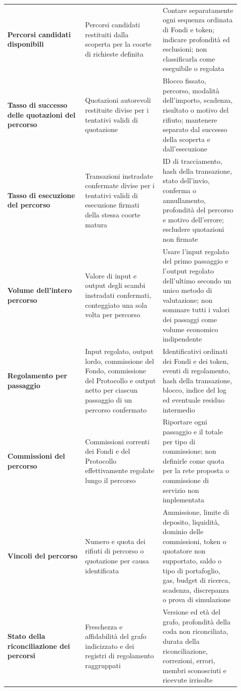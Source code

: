 \documentclass[11pt]{article}
\begin{document}
\begin{longtable}{P{0.31\linewidth} P{0.31\linewidth} P{0.31\linewidth}}
\textbf{Percorsi candidati disponibili} & Percorsi candidati restituiti dalla scoperta per la coorte di richieste definita & Contare separatamente ogni sequenza ordinata di Fondi e token; indicare profondità ed esclusioni; non classificarla come eseguibile o regolata \\
\textbf{Tasso di successo delle quotazioni del percorso} & Quotazioni autorevoli restituite divise per i tentativi validi di quotazione & Blocco fissato, percorso, modalità dell'importo, scadenza, risultato o motivo del rifiuto; mantenere separato dal successo della scoperta e dall'esecuzione \\
\textbf{Tasso di esecuzione del percorso} & Transazioni instradate confermate divise per i tentativi validi di esecuzione firmati della stessa coorte matura & ID di tracciamento, hash della transazione, stato dell'invio, conferma o annullamento, profondità del percorso e motivo dell'errore; escludere quotazioni non firmate \\
\textbf{Volume dell'intero percorso} & Valore di input e output degli scambi instradati confermati, conteggiato una sola volta per percorso & Usare l'input regolato del primo passaggio e l'output regolato dell'ultimo secondo un unico metodo di valutazione; non sommare tutti i valori dei passaggi come volume economico indipendente \\
\textbf{Regolamento per passaggio} & Input regolato, output lordo, commissione del Fondo, commissione del Protocollo e output netto per ciascun passaggio di un percorso confermato & Identificativi ordinati dei Fondi e dei token, eventi di regolamento, hash della transazione, blocco, indice del log ed eventuale residuo intermedio \\
\textbf{Commissioni del percorso} & Commissioni correnti dei Fondi e del Protocollo effettivamente regolate lungo il percorso & Riportare ogni passaggio e il totale per tipo di commissione; non definirle come quota per la rete proposta o commissione di servizio non implementata \\
\textbf{Vincoli del percorso} & Numero e quota dei rifiuti di percorso o quotazione per causa identificata & Ammissione, limite di deposito, liquidità, dominio delle commissioni, token o quotatore non supportato, saldo o tipo di portafoglio, gas, budget di ricerca, scadenza, discrepanza o prova di simulazione \\
\textbf{Stato della riconciliazione dei percorsi} & Freschezza e affidabilità del grafo indicizzato e dei registri di regolamento raggruppati & Versione ed età del grafo, profondità della coda non riconciliata, durata della riconciliazione, correzioni, errori, membri sconosciuti e ricevute irrisolte \\

\end{longtable}
\end{document}
